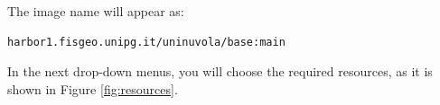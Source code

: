

The image name will appear as:
\begin{lstlisting}[language=bash] 
harbor1.fisgeo.unipg.it/uninuvola/base:main
\end{lstlisting}

In the next drop-down menus, you will choose the required resources, as it is shown in Figure \ref{fig:resources}.\\

